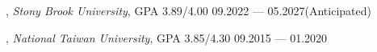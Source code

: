


, \textit{Stony Brook University}, GPA 3.89/4.00	\hfill 09.2022 --- 05.2027(Anticipated)

, \textit{National Taiwan University}, GPA 3.85/4.30 \hfill	09.2015 --- 01.2020
